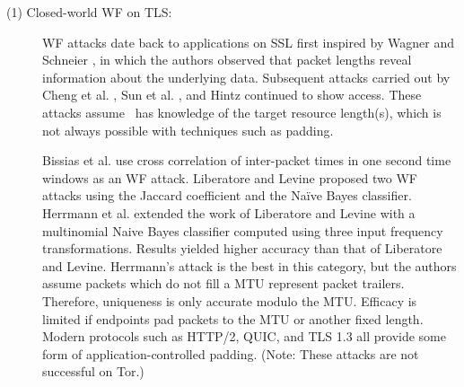 \documentclass[runningheads]{llncs}
\begin{document}
\begin{description}
\item [(1) Closed-world WF on TLS:] WF attacks date back to applications on SSL first inspired by Wagner and
Schneier \cite{wagner1996analysis}, in which the authors observed that
packet lengths reveal information about the underlying data. Subsequent attacks
carried out by Cheng et al. \cite{cheng1998traffic},
Sun et al. \cite{sun2002statistical}, and Hintz \cite{hintz2002fingerprinting} continued to show access.
These attacks assume \adv\ has knowledge of the target resource length(s),
which is not always possible with techniques such as padding.

Bissias et al. \cite{bissias2005privacy} use cross correlation of inter-packet
times in one second time windows as an WF attack.
Liberatore and Levine \cite{liberatore2006inferring} proposed two WF attacks
using the Jaccard coefficient and the Na\"{i}ve Bayes classifier.
Herrmann et al. \cite{herrmann2009website} extended the work of Liberatore and Levine with a multinomial
Naive Bayes classifier computed using three input frequency transformations.
Results yielded higher accuracy than that of Liberatore and Levine.
Herrmann's attack is the best in this category, but the authors assume packets which do not fill a MTU
represent packet trailers. Therefore, uniqueness is only accurate modulo the MTU. Efficacy
is limited if endpoints pad packets to the MTU or another fixed length. Modern protocols
such as HTTP/2, QUIC, and TLS 1.3 all provide some form of application-controlled padding.
(Note: These attacks are not successful on Tor.)

\end{description}
\end{document}

